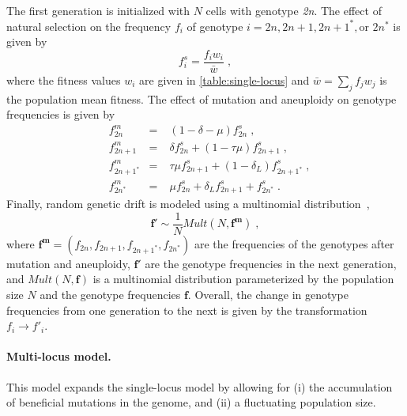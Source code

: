 \documentclass[12pt]{extarticle}
\let\vec\mathbf
\newcommand{\euwt}{\emph{2n}}
\begin{document}
The first generation is initialized with $N$ cells with genotype \euwt.
The effect of natural selection on the frequency $f_i$ of genotype $i = 2n, 2n+1, 2n+1^*, \text{or } 2n^*$ is given by
    \begin{equation} \label{eq:selection-single} 
      f^s_i = \frac{f_i w_i}{\bar{w}} \;,
    \end{equation}
where the fitness values $w_i$ are given in \autoref{table:single-locus} and $\bar{w} = \sum_{j}{f_j w_j}$ is the population mean fitness.
The effect of mutation and aneuploidy on genotype frequencies is given by
    \begin{equation} \label{eq:mutation-aneuploidy-single}
    \begin{aligned}
      &f^m_{2n} &=&\; (1 - \delta - \mu) f^s_{2n}  \;,\\
      &f^m_{2n+1} &=&\; \delta f^s_{2n} + (1 - \tau \mu) f^s_{2n+1}  \;,\\
      &f^m_{2n+1^*} &=&\; \tau \mu f^s_{2n+1} + (1-\delta_L) f^s_{2n+1^*}  \;,\\
      &f^m_{2n^*} &=&\; \mu f^s_{2n} + \delta_L f^s_{2n+1} + f^s_{2n^*}  \;.
    \end{aligned}
    \end{equation}
Finally, random genetic drift is modeled using a multinomial distribution~\citep{Otto2007},
    \begin{equation} \label{eq:drift-single}
      \vec{f'} \sim \frac{1}{N} Mult(N, \vec{f^m}) \;,
    \end{equation}
where $\vec{f^m}=(f_{2n},f_{2n+1},f_{2n+1^*},f_{2n^*})$ are the frequencies of the genotypes after mutation and aneuploidy, $\vec{f'}$ are the genotype frequencies in the next generation, and $Mult(N, \vec{f})$ is a multinomial distribution parameterized by the population size $N$ and the genotype frequencies $\vec{f}$.
Overall, the change in genotype frequencies from one generation to the next is given by the transformation $f_i \to f'_i$.

\paragraph*{Multi-locus model.}
This model expands the single-locus model by allowing for (i) the accumulation of beneficial mutations in the genome, and (ii) a fluctuating population size. 
\end{document}
